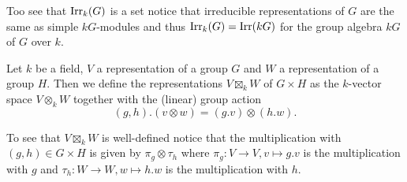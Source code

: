 Too see that $\operatorname{Irr}_k(G)$ is a set notice that irreducible representations of $G$ are the same as simple $kG$-modules and thus $\operatorname{Irr}_k(G) = \operatorname{Irr}(kG)$ for the group algebra $kG$ of $G$ over $k$.


\begin{defi}
 Let $k$ be a field, $V$ a representation of a group $G$ and $W$ a representation of a group $H$. Then we define the representations $V \boxtimes_k W$ of $G \times H$ as the $k$-vector space $V \otimes_k W$ together with the (linear) group action
 \[
  (g,h).(v \otimes w) = (g.v) \otimes (h.w).
 \]
\end{defi}


To see that $V \boxtimes_k W$ is well-defined notice that the multiplication with $(g,h) \in G \times H$ is given by $\pi_g \otimes \tau_h$ where $\pi_g \colon V \to V, v \mapsto g.v$ is the multiplication with $g$ and $\tau_h \colon W \to W, w \mapsto h.w$ is the multiplication with $h$.


